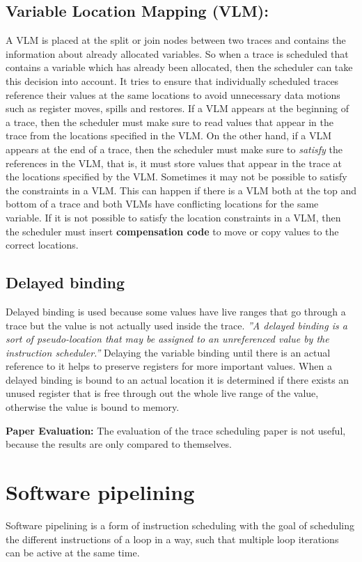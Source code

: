 \documentclass[a4paper,10pt]{article}
\begin{document}
\subsection{Variable Location Mapping (VLM):} 
A VLM is placed at the split or join nodes between two traces and contains the information about already allocated variables. So when a 
trace is scheduled that contains a variable which has already been allocated, then the scheduler can take this decision into account. It 
tries to ensure that individually scheduled traces reference their values at the same locations to avoid unnecessary data motions such as 
register moves, spills and restores. If a VLM appears at the beginning of a trace, then the scheduler must make sure to read values that 
appear in the trace from the locations specified in the VLM. On the other hand, if a VLM appears at the end of a trace, then the 
scheduler must make sure to \textit{satisfy} the references in the VLM, that is, it must store values that appear in the trace at the 
locations specified by the VLM. Sometimes it may not be possible to satisfy the constraints in a VLM. This can happen if there is a VLM 
both at the top and bottom of a trace and both VLMs have conflicting locations for the same variable. If it is not possible to satisfy 
the location constraints in a VLM, then the scheduler must insert \textbf{compensation code} to move or copy values to the correct 
locations.

\subsection{Delayed binding}
Delayed binding is used because some values have live ranges that go through a trace but the value is not actually used inside the 
trace. \textit{''A delayed binding is a sort of pseudo-location that may be assigned to an unreferenced value by the instruction 
scheduler.''} Delaying the variable binding until there is an actual reference to it helps to preserve registers for more important 
values. When a delayed binding is bound to an actual location it is determined if there exists an unused register that is free through out 
the whole live range of the value, otherwise the value is bound to memory.

\textbf{Paper Evaluation:} The evaluation of the trace scheduling paper is not useful, because the results are only compared to 
themselves.

\section{Software pipelining}
Software pipelining is a form of instruction scheduling with the goal of scheduling the different instructions of a loop in a way, such 
that multiple loop iterations can be active at the same time.
\end{document}
